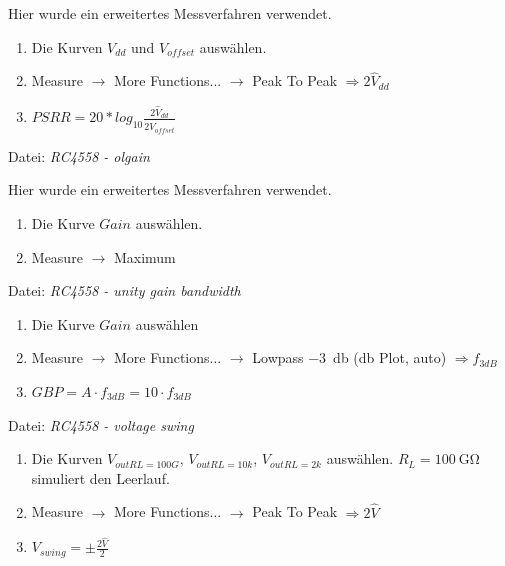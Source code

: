 \documentclass[
	ngerman,
	parskip=half,
	twocolumn,
	DIV=calc,
	]{scrartcl}
\begin{document}
	Hier wurde ein erweitertes Messverfahren \cite{website:amp_psrr_cmrr_circuits} verwendet.
	\begin{enumerate}
		\item Die Kurven $V_{dd}$ und $V_{offset}$ auswählen.
		\item Measure $\rightarrow$ More Functions... $\rightarrow$ Peak To Peak $\Rightarrow 2\hat{V}_{dd}$
		\item $ PSRR = 20 * log_{10} \frac{2\hat{V}_{dd}}{2\hat{V}_{offset}}$
	\end{enumerate}
	
	Datei: \emph{RC4558 - olgain}
	
	Hier wurde ein erweitertes Messverfahren \cite{website:amp_psrr_cmrr_circuits} verwendet.
	\begin{enumerate}
		\item Die Kurve $Gain$ auswählen.
		\item Measure $\rightarrow$ Maximum
	\end{enumerate}
	
	
	Datei: \emph{RC4558 - unity gain bandwidth}
	\begin{enumerate}
		\item Die Kurve $Gain$ auswählen
		\item Measure $\rightarrow$ More Functions... $\rightarrow$ Lowpass \SI{-3}{\decibel} (db Plot, auto) $\Rightarrow f_{3dB}$
		\item $ GBP = A \cdot f_{3dB} = 10 \cdot f_{3dB} $
	\end{enumerate}
	
	Datei: \emph{RC4558 - voltage swing}
	\begin{enumerate}
		\item Die Kurven $V_{out RL=100G}$, $V_{out RL=10k}$, $V_{out RL=2k}$ auswählen. $R_L=\SI{100}{\giga\ohm}$ simuliert den Leerlauf.
		\item Measure $\rightarrow$ More Functions... $\rightarrow$ Peak To Peak $\Rightarrow 2\hat{V}$
		\item $V_{swing} = \pm \frac{2\hat{V}}{2}$
	\end{enumerate}

\listoffigures
\listoftables
\printbibliography
		
\end{document}
